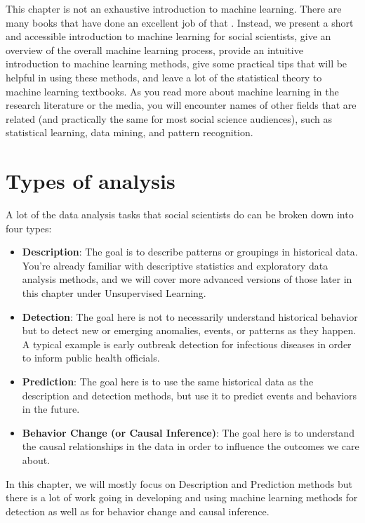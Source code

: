 \documentclass[]{krantz}
\begin{document}
This chapter is not an exhaustive introduction to machine learning.
There are many books that have done an excellent job of that
\citep{Flach, HastieTibshirani, mitchell1997machine}. Instead, we
present a short and accessible introduction to machine learning for
social scientists, give an overview of the overall machine learning
process, provide an intuitive introduction to machine learning methods,
give some practical tips that will be helpful in using these methods,
and leave a lot of the statistical theory to machine learning textbooks.
As you read more about machine learning in the research literature or
the media, you will encounter names of other fields that are related
(and practically the same for most social science audiences), such as
statistical learning, data mining, and pattern recognition.

\section{Types of analysis}\label{types-of-analysis}

A lot of the data analysis tasks that social scientists do can be broken
down into four types:

\begin{itemize}
\item
  \textbf{Description}: The goal is to describe patterns or groupings in
  historical data. You're already familiar with descriptive statistics
  and exploratory data analysis methods, and we will cover more advanced
  versions of those later in this chapter under Unsupervised Learning.
\item
  \textbf{Detection}: The goal here is not to necessarily understand
  historical behavior but to detect new or emerging anomalies, events,
  or patterns as they happen. A typical example is early outbreak
  detection for infectious diseases in order to inform public health
  officials.
\item
  \textbf{Prediction}: The goal here is to use the same historical data
  as the description and detection methods, but use it to predict events
  and behaviors in the future.
\item
  \textbf{Behavior Change (or Causal Inference)}: The goal here is to
  understand the causal relationships in the data in order to influence
  the outcomes we care about.
\end{itemize}

In this chapter, we will mostly focus on Description and Prediction
methods but there is a lot of work going in developing and using machine
learning methods for detection as well as for behavior change and causal
inference.
\end{document}

